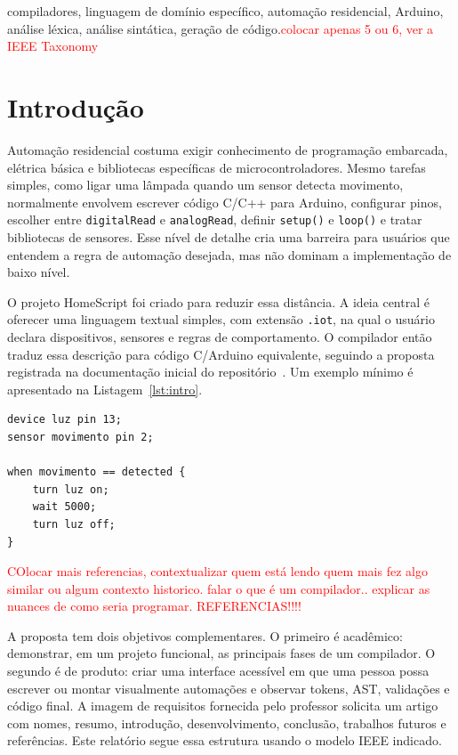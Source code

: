 \documentclass[conference]{IEEEtran}
\begin{document}
\begin{IEEEkeywords}
compiladores, linguagem de domínio específico, automação residencial, Arduino, análise léxica, análise sintática, geração de código.\textcolor{red}{colocar apenas 5 ou 6, ver a IEEE Taxonomy}
\end{IEEEkeywords}

\section{Introdução}
Automação residencial costuma exigir conhecimento de programação embarcada, elétrica básica e bibliotecas específicas de microcontroladores. Mesmo tarefas simples, como ligar uma lâmpada quando um sensor detecta movimento, normalmente envolvem escrever código C/C++ para Arduino, configurar pinos, escolher entre \texttt{digitalRead} e \texttt{analogRead}, definir \texttt{setup()} e \texttt{loop()} e tratar bibliotecas de sensores. Esse nível de detalhe cria uma barreira para usuários que entendem a regra de automação desejada, mas não dominam a implementação de baixo nível.

O projeto HomeScript foi criado para reduzir essa distância. A ideia central é oferecer uma linguagem textual simples, com extensão \texttt{.iot}, na qual o usuário declara dispositivos, sensores e regras de comportamento. O compilador então traduz essa descrição para código C/Arduino equivalente, seguindo a proposta registrada na documentação inicial do repositório~\cite{repo-readme,docs-def}. Um exemplo mínimo é apresentado na Listagem~\ref{lst:intro}.

\begin{lstlisting}[style=homescript,caption={Exemplo simples em HomeScript.},label={lst:intro}]
device luz pin 13;
sensor movimento pin 2;

when movimento == detected {
    turn luz on;
    wait 5000;
    turn luz off;
}
\end{lstlisting}
\textcolor{red}{COlocar mais referencias, contextualizar quem está lendo quem mais fez algo similar ou algum contexto historico. falar o que é um compilador.. explicar as nuances de como seria programar. REFERENCIAS!!!!}

A proposta tem dois objetivos complementares. O primeiro é acadêmico: demonstrar, em um projeto funcional, as principais fases de um compilador. O segundo é de produto: criar uma interface acessível em que uma pessoa possa escrever ou montar visualmente automações e observar tokens, AST, validações e código final. A imagem de requisitos fornecida pelo professor solicita um artigo com nomes, resumo, introdução, desenvolvimento, conclusão, trabalhos futuros e referências. Este relatório segue essa estrutura usando o modelo IEEE indicado.
\end{document}
